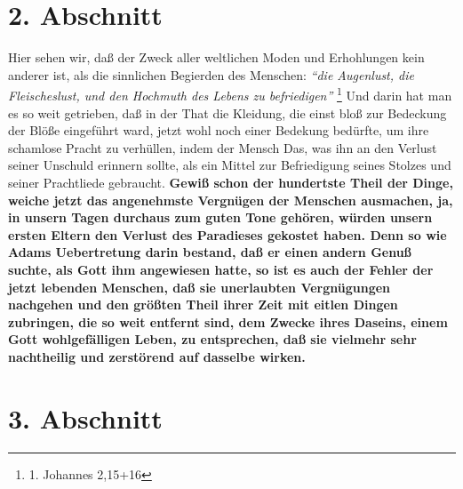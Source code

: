 \section{2. Abschnitt} \label{kap17_ab2}

Hier sehen wir, daß der Zweck aller weltlichen Moden und Erhohlungen kein
anderer ist, als die sinnlichen Begierden des Menschen:
\textit{"`die Augenlust, die
Fleischeslust, und den Hochmuth des Lebens zu befriedigen"'}
\footnote{1. Johannes 2,15+16}
Und darin hat man es so weit getrieben, daß in der That die Kleidung, die
einst bloß zur Bedeckung der Blöße eingeführt ward, jetzt wohl noch einer
Bedekung bedürfte, um ihre schamlose Pracht zu verhüllen, indem der Mensch Das,
was ihn an den Verlust seiner Unschuld erinnern sollte, als ein Mittel zur
Befriedigung seines Stolzes und seiner Prachtliede gebraucht. \textbf{Gewiß
schon der
hundertste Theil der Dinge, weiche jetzt das angenehmste Vergnügen der Menschen
ausmachen, ja, in unsern Tagen durchaus zum guten Tone gehören, würden unsern
ersten Eltern den Verlust des Paradieses gekostet haben. Denn so wie
Adams
Uebertretung darin bestand, daß er einen andern Genuß suchte, als Gott ihm
angewiesen hatte, so ist es auch der Fehler der jetzt lebenden Menschen, daß sie
unerlaubten Vergnügungen nachgehen und den größten Theil ihrer Zeit mit eitlen
Dingen zubringen, die so weit entfernt sind, dem Zwecke ihres Daseins, einem
Gott wohlgefälligen Leben, zu entsprechen, daß sie vielmehr sehr nachtheilig und
zerstörend auf dasselbe wirken.}

\section{3. Abschnitt} \label{kap17_ab3}

